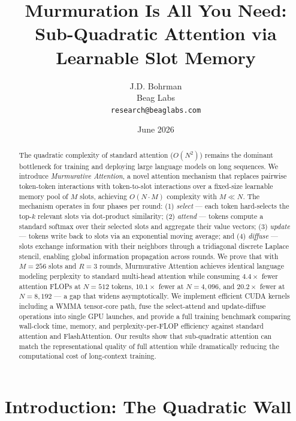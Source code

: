 \documentclass{article}
\title{Murmuration Is All You Need: Sub-Quadratic Attention via Learnable Slot Memory}
\author{
  J.D. Bohrman \\
  Beag Labs \\
  \texttt{research@beaglabs.com}
}
\date{June 2026}
\begin{document}
\maketitle

\begin{abstract}
The quadratic complexity of standard attention ($O(N^2)$) remains the dominant bottleneck for training and deploying large language models on long sequences. We introduce \textit{Murmurative Attention}, a novel attention mechanism that replaces pairwise token-token interactions with token-to-slot interactions over a fixed-size learnable memory pool of $M$ slots, achieving $O(N \cdot M)$ complexity with $M \ll N$. The mechanism operates in four phases per round: (1) \textit{select} — each token hard-selects the top-$k$ relevant slots via dot-product similarity; (2) \textit{attend} — tokens compute a standard softmax over their selected slots and aggregate their value vectors; (3) \textit{update} — tokens write back to slots via an exponential moving average; and (4) \textit{diffuse} — slots exchange information with their neighbors through a tridiagonal discrete Laplace stencil, enabling global information propagation across rounds. We prove that with $M = 256$ slots and $R = 3$ rounds, Murmurative Attention achieves identical language modeling perplexity to standard multi-head attention while consuming $4.4\times$ fewer attention FLOPs at $N=512$ tokens, $10.1\times$ fewer at $N=4{,}096$, and $20.2\times$ fewer at $N=8{,}192$ — a gap that widens asymptotically. We implement efficient CUDA kernels including a WMMA tensor-core path, fuse the select-attend and update-diffuse operations into single GPU launches, and provide a full training benchmark comparing wall-clock time, memory, and perplexity-per-FLOP efficiency against standard attention and FlashAttention. Our results show that sub-quadratic attention can match the representational quality of full attention while dramatically reducing the computational cost of long-context training.
\end{abstract}


\section{Introduction: The Quadratic Wall}
\end{document}
